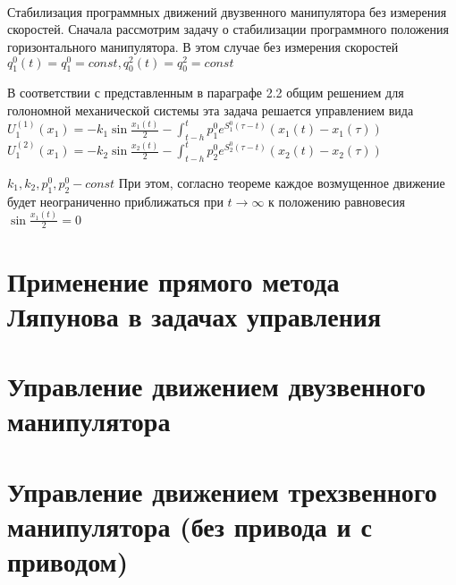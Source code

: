 \documentclass[14pt,a4paper,final,russian]{report}
\numberwithin{theorem}{chapter}
\numberwithin{lemma}{chapter}
\numberwithin{consectary}{chapter}
\numberwithin{pointout}{chapter}
\numberwithin{definition}{chapter}
\begin{document}
	\vglue 0.5cm
	
	\dotfill\mbox{\ \ \pageref{postfix}} \vglue 0.5cm
	
	 \dotfill\mbox{\ \ \pageref{bibl}}
	\par \vglue 0.5cm
	 \dotfill\mbox{\ \ \pageref{app1start}}
	
	\newpage
	
	\fontsize{14pt}{21pt}\selectfont
	
	
	
Стабилизация программных движений двузвенного манипулятора без измерения скоростей. Сначала рассмотрим задачу о стабилизации программного положения горизонтального манипулятора. В этом случае без измерения скоростей $q^0_1 (t) = q^0_1 = const, q^2_0 (t) = q^2_0 = const$

В соответствии с представленным в параграфе 2.2 общим решением для голономной механической системы эта задача решается управлением вида $U^{(1)}_1 (x_1) = - k_1 \sin \frac{x_1(t)}{2} - \int_{t-h}^t p_1^0 e^{S_1^0 (\tau - t)} (x_1 (t) - x_1 (\tau))$ $U^{(2)}_1 (x_1) = - k_2 \sin \frac{x_2(t)}{2} - \int_{t-h}^t p_2^0 e^{S_2^0 (\tau - t)} (x_2 (t) - x_2 (\tau))$

$k_1, k_2, p_1^0, p_2^0 - const$
При этом, согласно теореме каждое возмущенное движение будет неограниченно приближаться при $t \to \infty$ к положению равновесия $\sin \frac{x_1(t)}{2} = 0 $	\chapter{Применение прямого метода Ляпунова в задачах управления}
	
	
	 
	 
	 
	
	\chapter{Управление движением двузвенного манипулятора}
	
	
	 
	 
	
	\chapter{Управление движением трехзвенного манипулятора (без привода и с приводом)}
	
	
	 
	
	
	
	
	
	
\end{document}
